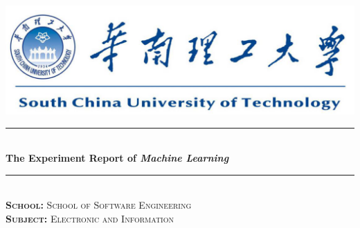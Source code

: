 \documentclass[journal, a4paper]{IEEEtran}
\begin{document}
\begin{titlepage}

\newcommand{\HRule}{\rule{\linewidth}{0.5mm}} %

\center %

~\\[1cm]
\includegraphics{SCUT.png}\\[2cm] %


\HRule \\[1cm]
{ \huge \bfseries The Experiment Report of \textit{Machine Learning} }\\[0.6cm] %
\HRule \\[2cm]


\textsc{\LARGE \textbf{School:} School of Software Engineering}\\[1cm]
\textsc{\LARGE \textbf{Subject:} Electronic and Information}\\[2cm]




\end{titlepage}
\end{document}
